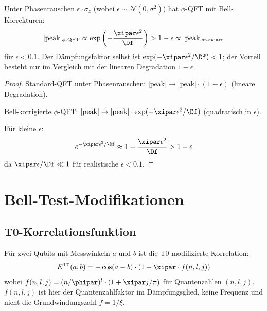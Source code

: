 \begin{corollary}[Dekohärenzunterdrückung]
	\label{cor:stability}
	Unter Phasenrauschen $\epsilon \cdot \sigma_z$ (wobei $\epsilon \sim \mathcal{N}(0, \sigma^2)$) hat $\phi$-QFT mit Bell-Korrekturen:
	\begin{equation}
		|\text{peak}|_{\text{$\phi$-QFT}} \propto \exp\left(-\frac{\xipar \epsilon^2}{\Df}\right) > 1 - \epsilon \propto |\text{peak}|_{\text{standard}}
	\end{equation}
	für $\epsilon < 0.1$. Der Dämpfungsfaktor selbst ist $\exp(-\xipar\epsilon^2/\Df) < 1$; der Vorteil besteht nur im Vergleich mit der linearen Degradation $1 - \epsilon$.
\end{corollary}

\begin{proof}
	Standard-QFT unter Phasenrauschen: $|\text{peak}| \to |\text{peak}| \cdot (1 - \epsilon)$ (lineare Degradation).
	
	Bell-korrigierte $\phi$-QFT: $|\text{peak}| \to |\text{peak}| \cdot \exp(-\xipar\epsilon^2/\Df)$ (quadratisch in $\epsilon$).
	
	Für kleine $\epsilon$:
	\begin{equation}
		e^{-\xipar\epsilon^2/\Df} \approx 1 - \frac{\xipar\epsilon^2}{\Df} > 1 - \epsilon
	\end{equation}
	da $\xipar\epsilon/\Df \ll 1$ für realistische $\epsilon < 0.1$.
\end{proof}

\section{Bell-Test-Modifikationen}
\label{sec:bell}

\subsection{T0-Korrelationsfunktion}

\begin{definition}
	Für zwei Qubits mit Messwinkeln $a$ und $b$ ist die T0-modifizierte Korrelation:
	\begin{equation}
		E^{\text{T0}}(a,b) = -\cos(a-b) \cdot \left(1 - \xipar \cdot f(n,l,j)\right)
		\label{eq:t0bell}
	\end{equation}
	wobei $f(n,l,j) = (n/\phipar)^l \cdot (1 + \xipar j/\pi)$ für Quantenzahlen $(n,l,j)$. $f(n,l,j)$ ist hier der Quantenzahlfaktor im Dämpfungsglied, keine Frequenz und nicht die Grundwindungszahl $f = 1/\xi$.
\end{definition}

